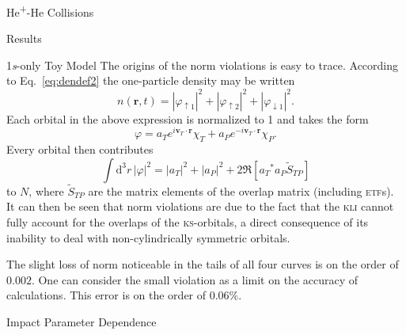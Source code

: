 \documentclass[letterpaper, 11 pt]{report}
\begin{document}
\begin{chapter}{\texorpdfstring{He\textsuperscript{+}}{He+}-He Collisions \label{chap:hephe}}
\begin{section}{Results \label{sec:hephe-disc}}
\begin{subsection}{1\textit{s}-only Toy Model \label{sec:toy}}
         The origins of the norm violations is easy to trace. According to Eq.~\eqref{eq:dendef2} the
         one-particle density may be written
         \begin{equation} \label{eq:toyden}
            n(\mathbf{r},t) = \left| \varphi_{\uparrow 1}\right|^2
                            + \left| \varphi_{\uparrow 2}\right|^2
                            + \left| \varphi_{\downarrow 1}\right|^2.
         \end{equation}
         Each orbital in the above expression is normalized to 1 and takes the form
         \begin{equation}
            \varphi = a_T e^{i \mathbf{v}_T \cdot \mathbf{r}} \chi_T
                    + a_P e^{-i \mathbf{v}_T \cdot \mathbf{r}} \chi_P.
         \end{equation}
         Every orbital then contributes
         \begin{equation}
            \int \mathrm{d}^3 r \, \left| \varphi \right|^2 = \left| a_T \right|^2
                                                            + \left| a_P \right|^2
            + 2 \Re \left[ {a_T}^* a_P \tilde{S}_{TP} \right]
         \end{equation}
         to $N$, where $\tilde{S}_{TP}$ are the matrix elements of the overlap matrix (including
         \textsc{etf}s). It can then be seen that norm violations are due to the fact that
         the \textsc{kli} cannot fully account for the overlaps of the \textsc{ks}-orbitals, a direct
         consequence of its inability to deal with non-cylindrically symmetric orbitals.

         The slight loss of norm noticeable in the tails of all four curves is on the order of $0.002$.
         One can consider the small violation as a limit on the accuracy of calculations. This error is
         on the order of $0.06 \%$.

      \end{subsection}

      \begin{subsection}{Impact Parameter Dependence}


\end{subsection}
\end{section}
\end{chapter}
\end{document}

